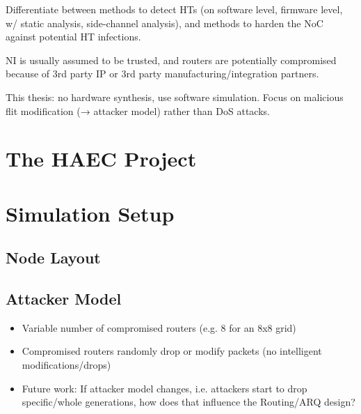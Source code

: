 \documentclass[
	paper=a4,
	fontsize=11pt,
	parskip=full %
]{scrreprt}
\begin{document}
    Differentiate between methods to detect HTs (on software level, firmware level, w/ static analysis, side-channel analysis), and methods to harden
    the NoC against potential HT infections.

    NI is usually assumed to be trusted, and routers are potentially compromised because of 3rd party IP or 3rd party manufacturing/integration partners.

    This thesis: no hardware synthesis, use software simulation. Focus on malicious flit modification (→ attacker model) rather than DoS attacks.

    \chapter{The HAEC Project}

    \chapter{Simulation Setup}
    \section{Node Layout}

    \section{Attacker Model}
    \begin{itemize}
        \item Variable number of compromised routers (e.g. 8 for an 8x8 grid)
        \item Compromised routers randomly drop or modify packets (no intelligent modifications/drops)
        \item Future work: If attacker model changes, i.e. attackers start to drop specific/whole generations,
            how does that influence the Routing/ARQ design?
    \end{itemize}
\end{document}
